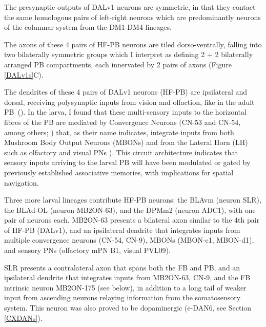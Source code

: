 
    The presynaptic outputs of DALv1 neurons are symmetric, in that they contact the same homologous pairs of left-right neurons which are predominantly neurons of the columnar system from the DM1-DM4 lineages.

    The axons of these 4 pairs of HF-PB neurons are tiled dorso-ventrally, falling into two bilaterally symmetric groups which I interpret as defining 2 + 2 bilaterally arranged PB compartments, each innervated by 2 pairs of axons (Figure \ref{DALv1s}C). 

    The dendrites of these 4 pairs of DALv1 neurons (HF-PB) are ipsilateral and dorsal, receiving polysynaptic inputs from vision and olfaction, like in the adult PB~(\citep{hulse2021connectome}). In the larva, I found that these multi-sensory inputs to the horizontal fibres of the PB are mediated by Convergence Neurons (CN-53 and CN-54, among others; \citep{eschbach2021circuits}) that, as their name indicates, integrate inputs from both Mushroom Body Output Neurons (MBONs) and from the Lateral Horn (LH) such as olfactory and visual PNs \citep{eschbach2020recurrent}). This circuit architecture indicates that sensory inputs arriving to the larval PB will have been modulated or gated by previously established associative memories, with implications for spatial navigation.

    Three more larval lineages contribute HF-PB neurons: the BLAvm (neuron SLR), the BLAd-OL (neuron MB2ON-63), and the DPMm2 (neuron ADC1),  with one pair of neurons each. 
    MB2ON-63 presents a bilateral axon similar to the 4th pair of HF-PB (DALv1), and an ipsilateral dendrite that integrates inputs from multiple convergence neurons (CN-54, CN-9), MBONs (MBON-c1, MBON-d1), and sensory PNs (olfactory mPN B1, visual PVL09).

    SLR presents a contralateral axon that spans both the FB and PB, and an ipsilateral dendrite that integrates inputs from MB2ON-63, CN-9, and the FB intrinsic neuron MB2ON-175 (see below), in addition to a long tail of weaker input from ascending neurons relaying information from the somatosensory system. This neuron was also proved to be dopaminergic (e-DAN6, see Section \ref{CXDANs}). 

